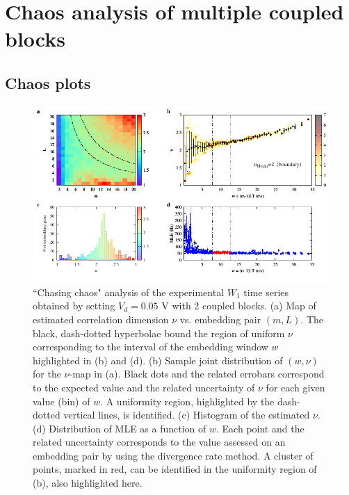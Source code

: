 \chapter{Chaos analysis of multiple coupled blocks}
\label{chap: multi block}

\section{Chaos plots}


\begin{figure}[H]
    \centering
    \includegraphics[width=\linewidth]{../blocks/2_blocks/1e5_points/plots/chaos.pdf}
    \caption{``Chasing chaos" analysis of the experimental $W_1$ time series obtained by setting $V_d=0.05$ V with 2 coupled blocks.
    (a) Map of estimated correlation dimension $\nu$ vs. embedding pair $(m, L)$.
    The black, dash-dotted hyperbolae bound the region of uniform $\nu$ corresponding to the interval of the
    embedding window $w$ highlighted in (b) and (d).
    (b) Sample joint distribution of $(w,\nu)$ for the $\nu$-map in (a).
    Black dots and the related errobars correspond to the expected value and the related uncertainty of $\nu$
    for each given value (bin) of $w$. A uniformity region, highlighted by the dash-dotted vertical lines,
    is identified. (c) Histogram of the estimated $\nu$. (d) Distribution of MLE as a function of $w$. Each point and the related
    uncertainty corresponds to the value assessed on an embedding pair by using the divergence rate method.
    A cluster of points, marked in red, can be identified in the uniformity region of (b), also highlighted here.}
    \label{fig:2 blocks chaos}
\end{figure}


